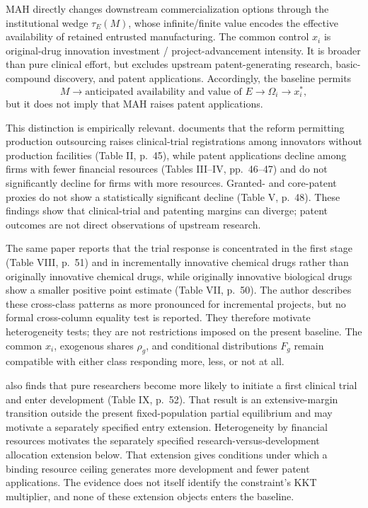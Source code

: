 \documentclass[11pt]{article}
\newcommand{\1}{\mathbf{1}}
\begin{document}
MAH directly changes downstream commercialization options through the
institutional wedge \(\tau_E(M)\), whose infinite/finite value encodes the
effective availability of retained entrusted manufacturing. The common
control \(x_i\) is original-drug innovation investment /
project-advancement intensity. It is broader than pure clinical effort, but
excludes upstream patent-generating research, basic-compound discovery, and
patent applications. Accordingly, the baseline permits
\[
  M
  \longrightarrow
  \text{anticipated availability and value of }E
  \longrightarrow
  \Omega_i
  \longrightarrow
  x_i^*,
\]
but it does not imply that MAH raises patent applications.

This distinction is empirically relevant. \citet{Gu2024} documents that the
reform permitting production outsourcing raises clinical-trial registrations
among innovators without production facilities (Table II, p.~45), while
patent applications decline among firms with fewer financial resources
(Tables III--IV, pp.~46--47) and do not significantly decline for firms with
more resources. Granted- and core-patent proxies do not show a statistically
significant decline (Table V, p.~48). These findings show that clinical-trial
and patenting margins can diverge; patent outcomes are not direct
observations of upstream research.

The same paper reports that the trial response is concentrated in the first
stage (Table VIII, p.~51) and in incrementally innovative chemical drugs
rather than originally innovative chemical drugs, while originally
innovative biological drugs show a smaller positive point estimate (Table
VII, p.~50). The author describes these cross-class patterns as more
pronounced for incremental projects, but no formal cross-column equality test
is reported. They therefore motivate heterogeneity tests; they are not
restrictions imposed on the present baseline. The common \(x_i\), exogenous
shares \(\rho_g\), and conditional distributions \(F_g\) remain compatible
with either class responding more, less, or not at all.

\citet{Gu2024} also finds that pure researchers become more likely to
initiate a first clinical trial and enter development (Table IX, p.~52).
That result is an extensive-margin transition outside the present
fixed-population partial equilibrium and may motivate a separately specified
entry extension. Heterogeneity by financial resources motivates the
separately specified research-versus-development allocation extension below.
That extension gives conditions under which a binding resource ceiling
generates more development and fewer patent applications. The evidence does
not itself identify the constraint's KKT multiplier, and none of these
extension objects enters the baseline.




\clearpage


\end{document}
